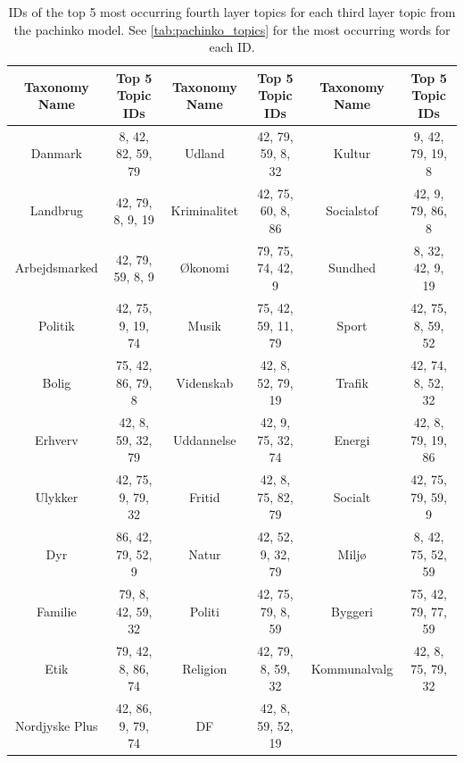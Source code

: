 \begin{table}[h]
	\centering
	\caption{IDs of the top 5 most occurring fourth layer topics for each third layer topic from the pachinko model. See \autoref{tab:pachinko_topics} for the most occurring words for each ID.}
	\label{tab:pachinko_mid_topics}
	\begin{tabular}{c | c | c | c | c | c}
		Taxonomy Name & Top 5 Topic IDs & Taxonomy Name & Top 5 Topic IDs & Taxonomy Name & Top 5 Topic IDs \\ \hline
		Danmark & 8, 42, 82, 59, 79 & Udland & 42, 79, 59, 8, 32 & Kultur & 9, 42, 79, 19, 8 \\
		Landbrug & 42, 79, 8, 9, 19 & Kriminalitet & 42, 75, 60, 8, 86 & Socialstof & 42, 9, 79, 86, 8 \\
		Arbejdsmarked & 42, 79, 59, 8, 9 & Økonomi & 79, 75, 74, 42, 9 & Sundhed & 8, 32, 42, 9, 19 \\
		Politik & 42, 75, 9, 19, 74 & Musik & 75, 42, 59, 11, 79 & Sport & 42, 75, 8, 59, 52 \\
		Bolig & 75, 42, 86, 79, 8 & Videnskab & 42, 8, 52, 79, 19 & Trafik & 42, 74, 8, 52, 32 \\
		Erhverv & 42, 8, 59, 32, 79 & Uddannelse & 42, 9, 75, 32, 74 & Energi & 42, 8, 79, 19, 86 \\
		Ulykker & 42, 75, 9, 79, 32 & Fritid & 42, 8, 75, 82, 79 & Socialt & 42, 75, 79, 59, 9 \\
		Dyr & 86, 42, 79, 52, 9 & Natur & 42, 52, 9, 32, 79 & Miljø & 8, 42, 75, 52, 59 \\
		Familie & 79, 8, 42, 59, 32 & Politi & 42, 75, 79, 8, 59 & Byggeri & 75, 42, 79, 77, 59 \\
		Etik & 79, 42, 8, 86, 74 & Religion & 42, 79, 8, 59, 32 & Kommunalvalg & 42, 8, 75, 79, 32 \\
		Nordjyske Plus & 42, 86, 9, 79, 74 & DF & 42, 8, 59, 52, 19 & & \\
	\end{tabular}
\end{table}
